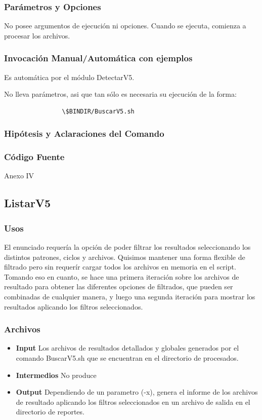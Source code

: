 \documentclass[a4paper,10pt,titlepage]{article}
\begin{document}
		\subsubsection{Par\'ametros y Opciones}
			 No posee argumentos de ejecución ni opciones. Cuando se ejecuta, comienza a procesar los archivos.
	
		\subsubsection{Invocaci\'on Manual/Autom\'atica con ejemplos}
Es automática por el módulo DetectarV5. 

No lleva parámetros, asi que tan sólo es necesaria su ejecución de la forma:
			\begin{verbatim}
				\$BINDIR/BuscarV5.sh
			\end{verbatim}

		\subsubsection{Hip\'otesis y Aclaraciones del Comando}

		\subsubsection{C\'odigo Fuente}
			Anexo IV

	\subsection{ListarV5}
		\subsubsection{Usos}
			 
El enunciado requería la opción de poder filtrar los resultados seleccionando los distintos patrones, ciclos y archivos. Quisimos mantener una forma flexible de filtrado pero sin requerír cargar todos los archivos en memoria en el script. Tomando eso en cuanto, se hace una primera iteración sobre los archivos de resultado para obtener las diferentes opciones de filtrados, que pueden ser combinadas de cualquier manera, y luego una segunda iteración para mostrar los resultados aplicando los filtros seleccionados.

		\subsubsection{Archivos}
			\begin {itemize}
				\item \textbf{Input} {Los archivos de resultados detallados y globales generados por el comando BuscarV5.sh que se encuentran en el directorio de procesados.}
				\item \textbf{Intermedios} {No produce}
				\item \textbf{Output} {Dependiendo de un parametro (-x), genera el informe de los archivos de resultado aplicando los filtros seleccionados en un archivo de salida en el directorio de reportes.}
			\end{itemize}
\end{document}
